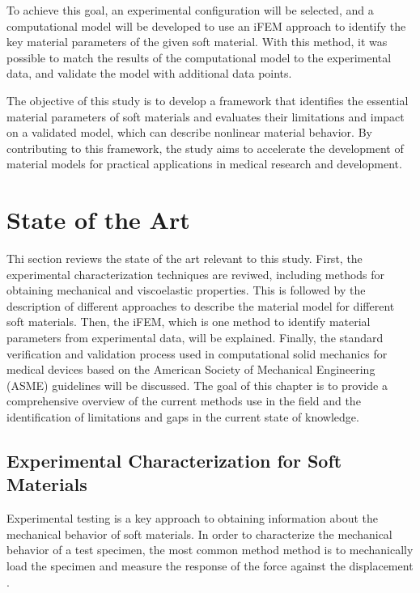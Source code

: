 To achieve this goal, an experimental configuration will be selected, and a computational model will be 
developed to use an iFEM approach to identify the key material parameters of the given soft material. 
With this method, it was possible to match the results of the computational model to the experimental 
data, and validate the model with additional data points. 

The objective of this study is to develop a framework that identifies the essential material parameters of soft materials 
and evaluates their limitations and impact on a validated model, which can describe nonlinear material behavior.
By contributing to this framework, the study aims to accelerate the development of material models for practical 
applications in medical research and development.
\section{State of the Art}

Thi section reviews the state of the art relevant to this study. First, the experimental characterization 
techniques are reviwed, including methods for obtaining mechanical and viscoelastic properties.
This is followed by the description of different approaches to describe the material model for different soft 
materials. Then, the iFEM, which is one method to identify material parameters from experimental data, 
will be explained. Finally, the standard verification and validation process used in computational 
solid mechanics for medical devices based on the American Society of Mechanical Engineering (ASME) guidelines 
will be discussed. The goal of this chapter is to provide a comprehensive overview of the current methods use in 
the field and the identification of limitations and gaps in the current state of knowledge. %

\subsection{Experimental Characterization for Soft Materials}
\label{subsection:experimentalcharacterization}
Experimental testing is a key approach to obtaining information about the mechanical behavior of soft materials.
In order to characterize the mechanical behavior of a test specimen, the most common method
method is to mechanically load the specimen and measure the response of the force against 
the displacement \cite{Bergström2015}. \\


